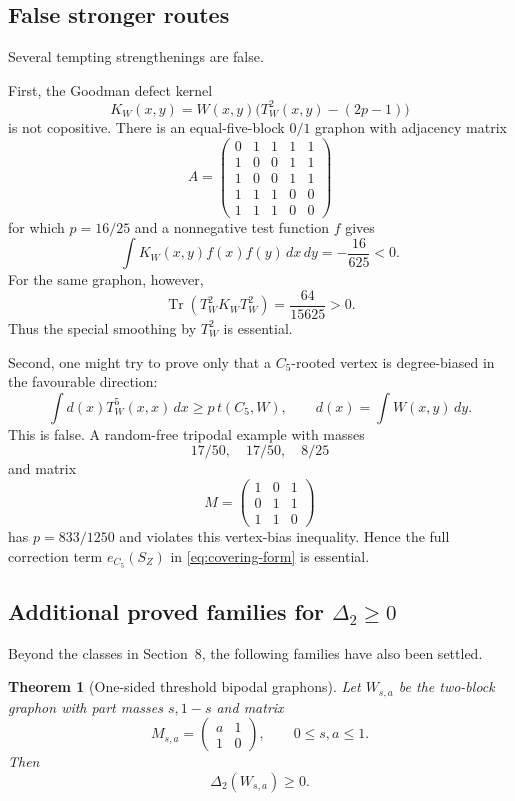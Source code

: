 \documentclass[11pt]{article}
\newtheorem{theorem}{Theorem}[section]
\theoremstyle{definition}
\begin{document}
\subsection{False stronger routes}

Several tempting strengthenings are false.

First, the Goodman defect kernel
\[
  K_W(x,y)=W(x,y)\bigl(T_W^2(x,y)-(2p-1)\bigr)
\]
is not copositive.  There is an equal-five-block $0/1$ graphon with adjacency matrix
\[
A=
\begin{pmatrix}
0&1&1&1&1\\
1&0&0&1&1\\
1&0&0&1&1\\
1&1&1&0&0\\
1&1&1&0&0
\end{pmatrix}
\]
for which $p=16/25$ and a nonnegative test function $f$ gives
\[
  \int K_W(x,y)f(x)f(y)\,dx\,dy=-\frac{16}{625}<0.
\]
For the same graphon, however,
\[
  \operatorname{Tr}(T_W^2K_WT_W^2)=\frac{64}{15625}>0.
\]
Thus the special smoothing by $T_W^2$ is essential.

Second, one might try to prove only that a $C_5$-rooted vertex is degree-biased in the favourable direction:
\[
  \int d(x)T_W^5(x,x)\,dx\ge p\,t(C_5,W),
  \qquad d(x)=\int W(x,y)\,dy.
\]
This is false.  A random-free tripodal example with masses
\[
  17/50,\quad 17/50,\quad 8/25
\]
and matrix
\[
M=
\begin{pmatrix}
1&0&1\\
0&1&1\\
1&1&0
\end{pmatrix}
\]
has $p=833/1250$ and violates this vertex-bias inequality.  Hence the full correction term $e_{C_5}(S_Z)$ in \eqref{eq:covering-form} is essential.

\subsection{Additional proved families for $\Delta_2\ge0$}

Beyond the classes in Section~8, the following families have also been settled.

\begin{theorem}[One-sided threshold bipodal graphons]
Let $W_{s,a}$ be the two-block graphon with part masses $s,1-s$ and matrix
\[
  M_{s,a}=\begin{pmatrix}a&1\\1&0\end{pmatrix},
  \qquad 0\le s,a\le1.
\]
Then
\[
  \Delta_2(W_{s,a})\ge0.
\]
\end{theorem}
\end{document}
